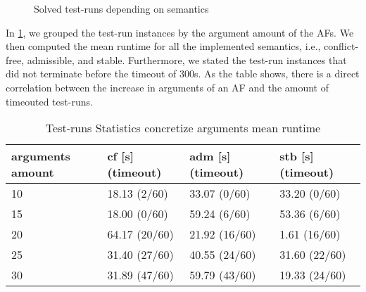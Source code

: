 \begin{figure}[H]
    \centering
    \caption{Solved test-runs depending on semantics}
    \label{fig:expconcretize/Semantics/OnePlot}
\end{figure}

In \cref{table:ExperimentStatisticsConcretize}, we grouped the test-run instances by the argument amount of the AFs. We then computed the mean runtime for all the implemented semantics, i.e., conflict-free, admissible, and stable. Furthermore, we stated the test-run instances that did not terminate before the timeout of 300s. As the table shows, there is a direct correlation between the increase in arguments of an AF and the amount of timeouted test-runs. 


\begin{table}[H]
    \centering
    \caption{Test-runs Statistics concretize arguments mean runtime}
    \begin{tabular}{ |l|l|l|l| }
        \hline
            arguments amount & cf [s] (timeout)& adm [s] (timeout)& stb [s] (timeout)\\
        \hline
            10 & 18.13 \hfill (2/60)  &  33.07 \hfill (0/60)  &  33.20 \hfill (0/60) \\
            15 & 18.00 \hfill (0/60)  &  59.24 \hfill (6/60)  &  53.36 \hfill (6/60) \\
            20 & 64.17 \hfill (20/60) &  21.92 \hfill (16/60) &   1.61 \hfill (16/60) \\
            25 & 31.40 \hfill (27/60) &  40.55 \hfill (24/60) &  31.60 \hfill (22/60) \\
            30 & 31.89 \hfill (47/60) &  59.79 \hfill (43/60) &  19.33 \hfill (24/60) \\
        \hline
    \end{tabular}
\label{table:ExperimentStatisticsConcretize}
\end{table}


